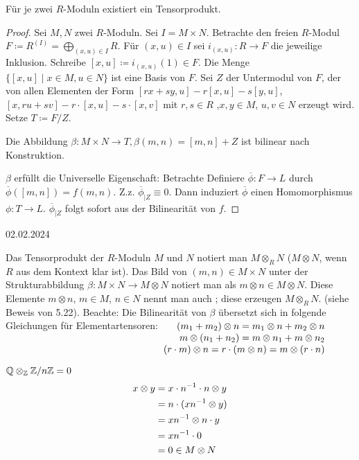 \documentclass[../main.tex]{subfiles}
\begin{document}
\begin{theorem}
    Für je zwei $R$-Moduln existiert ein Tensorprodukt.
\end{theorem}
\begin{proof}
    Sei $M,N$ zwei $R$-Moduln. Sei $I=M\times N$.
    Betrachte den freien $R$-Modul $F\coloneqq R^{(I)} = \bigoplus_{(x,u)\in I} R$.
    Für $(x,u)\in I$ sei $i_{(x,u)}:R\rightarrow F$ die jeweilige Inklusion.
    Schreibe $[x,u] \coloneqq i_{(x,u)} (1)\in F$.
    Die Menge $\{[x,u]\mid x\in M, u\in N\}$ ist eine Basis von $F$.
    Sei $Z$ der Untermodul von $F$, der von allen Elementen der Form $[rx+sy,u] - r[x,u] - s[y,u]$,
    $[x, ru+sv] - r\cdot [x,u] - s\cdot [x,v]$ mit $r,s\in R$ ,$x,y\in M$, $u,v\in N$ erzeugt wird.
    Setze $T\coloneqq F/Z.$

    Die Abbildung $\beta:M\times N \rightarrow T, \beta(m,n) = [m,n]+Z$ ist bilinear nach Konstruktion.

    $\beta$ erfüllt die Universelle Eigenschaft:
    Betrachte 
    Definiere $\overline{\phi}:F\rightarrow L$ durch $\overline{\phi} ([m,n]) = f(m,n)$.
    Z.z. $\overline{\phi}_{|Z} \equiv 0$. Dann induziert $\overline{\phi}$ einen Homomorphismus $\phi: T\rightarrow L$.
    $\overline{\phi}_{|Z}$ folgt sofort aus der Bilinearität von $f$.
\end{proof}
\begin{flushright}
    02.02.2024
\end{flushright}
\begin{remark}[Notation]
    Das Tensorprodukt der $R$-Moduln $M$ und $N$ notiert man ${M\otimes_R N}$
    ($M\otimes N$, wenn $R$ aus dem Kontext klar ist).
    Das Bild von $(m,n)\in M\times N$ unter der Strukturabbildung $\beta: M\times N \rightarrow M\otimes N$ notiert man als $m\otimes n\in M\otimes N$.
    Diese Elemente $m\otimes n$, $m\in M$, $n\in N$ nennt man auch ; diese erzeugen $M\otimes_R N$. (siehe Beweis von 5.22).
    Beachte: Die Bilinearität von $\beta$ übersetzt sich in folgende Gleichungen für Elementartensoren:$\begin{array}[t]{r}
(m_1 + m_2)\otimes n = m_1\otimes n + m_2 \otimes n \\
m\otimes (n_1 + n_2)=m\otimes n_1 + m\otimes n_2 \\
(r\cdot m)\otimes n = r\cdot (m\otimes n) = m\otimes (r\cdot n)
\end{array}$
\end{remark}
\begin{example}
    $\mathbb{Q}\otimes_{\mathbb{Z}} \mathbb{Z}/n\mathbb{Z} = 0$
    \begin{align*}
        x\otimes y &= x\cdot n^{-1}\cdot n \otimes y\\
        &= n\cdot (xn^{-1}\otimes y)\\
        &= xn^{-1}\otimes n\cdot y\\
        &= xn^{-1}\cdot 0\\
        &= 0\in M\otimes N
    \end{align*}
\end{example}
\end{document}
